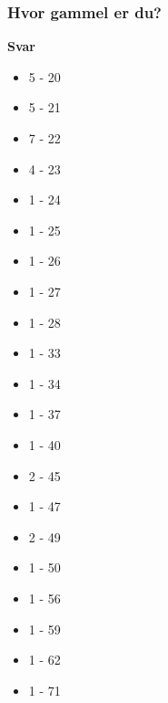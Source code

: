 \subsubsection{Hvor gammel er du?}
\textbf{Svar}
\begin{itemize}
    \item 5 - 20
    \item 5 - 21
    \item 7 - 22
    \item 4 - 23
    \item 1 - 24
    \item 1 - 25
    \item 1 - 26
    \item 1 - 27
    \item 1 - 28
    \item 1 - 33
    \item 1 - 34
    \item 1 - 37
    \item 1 - 40
    \item 2 - 45
    \item 1 - 47
    \item 2 - 49
    \item 1 - 50
    \item 1 - 56
    \item 1 - 59
    \item 1 - 62
    \item 1 - 71
\end{itemize}

